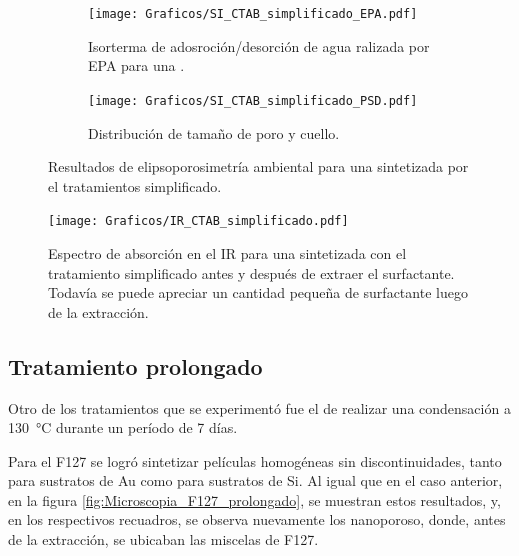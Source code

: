 {		\begin{figure}[!ht]	
			\begin{subfigure}[t]{0.495\textwidth}
		  	\texttt{[image: Graficos/SI\_CTAB\_simplificado\_EPA.pdf]}
			\caption{Isorterma de adosroción/desorción de agua ralizada por EPA para una \pdmC.}
			\label{fig:CTAB_simplificado_EPA}
			\end{subfigure}
			\begin{subfigure}[t]{0.495\textwidth}
		  	\texttt{[image: Graficos/SI\_CTAB\_simplificado\_PSD.pdf]}
			\caption{Distribución de tamaño de poro y cuello.\\ }
			\label{fig:CTAB_simplificado_PSD}
			\end{subfigure}
			\caption[Elipsoporosimetría \pdmC\space tratamiento simplificado.]{Resultados de elipsoporosimetría ambiental para una \pdmC\space sintetizada por el tratamientos simplificado.}
			\end{figure}
		
		\begin{figure}[!ht]
			\begin{center}
			\texttt{[image: Graficos/IR\_CTAB\_simplificado.pdf]}
			\caption[FTIR \pdmC\space tratamiento simplificado.]{Espectro de absorción en el IR para una \pdmC\space sintetizada con el tratamiento simplificado antes y después de extraer el surfactante. Todavía se puede apreciar un cantidad pequeña de surfactante luego de la extracción.}
			\label{fig:IR_CTAB_simplificado}
			\end{center}
			\end{figure}	

	\subsection{Tratamiento prolongado}

		Otro de los tratamientos que se experimentó fue el de realizar una condensación a \SI{130}{\celsius} durante un período de 7 días. 

		Para el F127 se logró sintetizar películas homogéneas sin discontinuidades, tanto para sustratos de Au como para sustratos de Si. Al igual que en el caso anterior, en la figura \ref{fig:Microscopia_F127_prolongado}, se muestran estos resultados, y, en los respectivos recuadros, se observa nuevamente los nanoporoso, donde, antes de la extracción, se ubicaban las miscelas de F127. 

}
